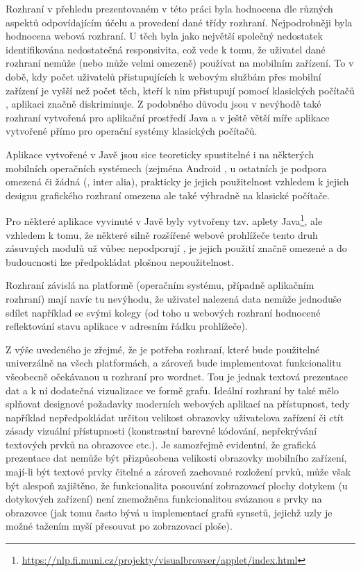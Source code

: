 \documentclass[a4paper, 11pt, oneside]{book}
\begin{document}
			Rozhraní v přehledu prezentovaném v této práci byla hodnocena dle různých aspektů odpovídajícím účelu a provedení dané třídy rozhraní. Nejpodrobněji byla hodnocena webová rozhraní. U těch byla jako největší společný nedostatek identifikována nedostatečná responsivita, což vede k tomu, že uživatel dané rozhraní nemůže (nebo může velmi omezeně) používat na mobilním zařízení. To v době, kdy počet uživatelů přistupujících k webovým službám přes mobilní zařízení je vyšší než počet těch, kteří k nim přistupují pomocí klasických počítačů \parencite{Heisler2016}, aplikaci značně diskriminuje. Z podobného důvodu jsou v nevýhodě také rozhraní vytvořená pro aplikační prostředí Java a v ještě větší míře aplikace vytvořené přímo pro operační systémy klasických počítačů. 

			Aplikace vytvořené v Javě jsou sice teoreticky spustitelné i na některých mobilních operačních systémech (zejména Android \parencite{SX92854}, u ostatních je podpora omezená či žádná (\textcite{SX15501535}, \textcite{SX1193541} inter alia), prakticky je jejich použitelnost vzhledem k jejich designu grafického rozhraní omezena ale také výhradně na klasické počítače. 

			Pro některé aplikace vyvinuté v Javě byly vytvořeny tzv. aplety Java\footnote{\url{https://nlp.fi.muni.cz/projekty/visualbrowser/applet/index.html}}, ale vzhledem k tomu, že některé silně rozšířené webové prohlížeče tento druh zásuvných modulů už vůbec nepodporují \parencite{MozzilaFoundation2017}, je jejich použití značně omezené a do budoucnosti lze předpokládat plošnou nepoužitelnost. 

			Rozhraní závislá na platformě (operačním systému, případně aplikačním rozhraní) mají navíc tu nevýhodu, že uživatel nalezená data nemůže jednoduše sdílet například se svými kolegy (od toho u webových rozhraní hodnocené reflektování stavu aplikace v adresním řádku prohlížeče). 

			Z výše uvedeného je zřejmé, že je potřeba rozhraní, které bude použitelné univerzálně na všech platformách, a zároveň bude implementovat funkcionalitu všeobecně očekávanou u rozhraní pro wordnet. Tou je jednak textová prezentace dat a k ní dodatečná vizualizace ve formě grafu. Ideální rozhraní by také mělo splňovat designové požadavky moderních webových aplikací na přístupnost, tedy například nepředpokládat určitou velikost obrazovky uživatelova zařízení či ctít zásady vizuální přístupnosti (konstrastní barevné kódování, nepřekrývání textových prvků na obrazovce etc.). Je samozřejmě evidentní, že grafická prezentace dat nemůže být přizpůsobena velikosti obrazovky mobilního zařízení, mají-li být textové prvky čitelné a zároveň zachované rozložení prvků, může však být alespoň zajištěno, že funkcionalita posouvání zobrazovací plochy dotykem (u dotykových zařízení) není znemožněna funkcionalitou svázanou s prvky na obrazovce (jak tomu často bývá u implementací grafů synsetů, jejichž uzly je možné tažením myší přesouvat po zobrazovací ploše). 
\end{document}

